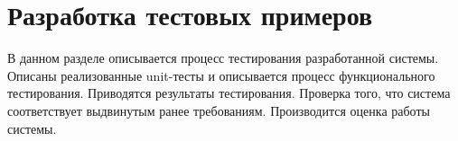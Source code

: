 




\section{Разработка тестовых примеров}
\begin{annotation}
	В данном разделе описывается процесс тестирования разработанной системы.
	Описаны реализованные unit-тесты и описывается процесс функционального тестирования.
	Приводятся результаты тестирования. Проверка того, что система соответствует выдвинутым ранее требованиям.
	Производится оценка работы системы.
\end{annotation}





